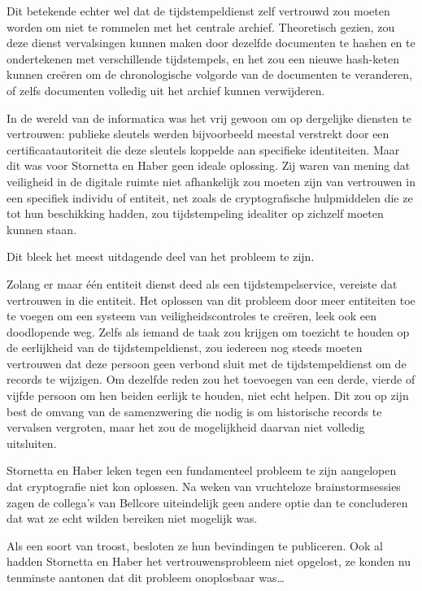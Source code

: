 \documentclass[
  a5paper,
  smalldemyvopaper,11pt,twoside,onecolumn,openright,extrafontsizes]{memoir}
\begin{document}
Dit betekende echter wel dat de tijdstempeldienst zelf vertrouwd zou
moeten worden om niet te rommelen met het centrale archief. Theoretisch
gezien, zou deze dienst vervalsingen kunnen maken door dezelfde
documenten te hashen en te ondertekenen met verschillende tijdstempels,
en het zou een nieuwe hash-keten kunnen creëren om de chronologische
volgorde van de documenten te veranderen, of zelfs documenten volledig
uit het archief kunnen verwijderen.

In de wereld van de informatica was het vrij gewoon om op dergelijke
diensten te vertrouwen: publieke sleutels werden bijvoorbeeld meestal
verstrekt door een certificaatautoriteit die deze sleutels koppelde aan
specifieke identiteiten. Maar dit was voor Stornetta en Haber geen
ideale oplossing. Zij waren van mening dat veiligheid in de digitale
ruimte niet afhankelijk zou moeten zijn van vertrouwen in een specifiek
individu of entiteit, net zoals de cryptografische hulpmiddelen die ze
tot hun beschikking hadden, zou tijdstempeling idealiter op zichzelf
moeten kunnen staan.

Dit bleek het meest uitdagende deel van het probleem te zijn.

Zolang er maar één entiteit dienst deed als een tijdstempelservice,
vereiste dat vertrouwen in die entiteit. Het oplossen van dit probleem
door meer entiteiten toe te voegen om een systeem van
veiligheidscontroles te creëren, leek ook een doodlopende weg. Zelfs als
iemand de taak zou krijgen om toezicht te houden op de eerlijkheid van
de tijdstempeldienst, zou iedereen nog steeds moeten vertrouwen dat deze
persoon geen verbond sluit met de tijdstempeldienst om de records te
wijzigen. Om dezelfde reden zou het toevoegen van een derde, vierde of
vijfde persoon om hen beiden eerlijk te houden, niet echt helpen. Dit
zou op zijn best de omvang van de samenzwering die nodig is om
historische records te vervalsen vergroten, maar het zou de mogelijkheid
daarvan niet volledig uitsluiten.

Stornetta en Haber leken tegen een fundamenteel probleem te zijn
aangelopen dat cryptografie niet kon oplossen. Na weken van vruchteloze
brainstormsessies zagen de collega's van Bellcore uiteindelijk geen
andere optie dan te concluderen dat wat ze echt wilden bereiken niet
mogelijk was.

Als een soort van troost, besloten ze hun bevindingen te publiceren. Ook
al hadden Stornetta en Haber het vertrouwensprobleem niet opgelost, ze
konden nu tenminste aantonen dat dit probleem onoplosbaar was\ldots{}
\end{document}

